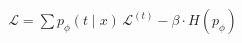 \documentclass[preview]{standalone}
\begin{document}
\begin{align*}
\mathcal{L} = \sum p_\phi(t \mid x)\,\mathcal{L}^{(t)} - \beta \cdot H(p_\phi)
\end{align*}
\end{document}
